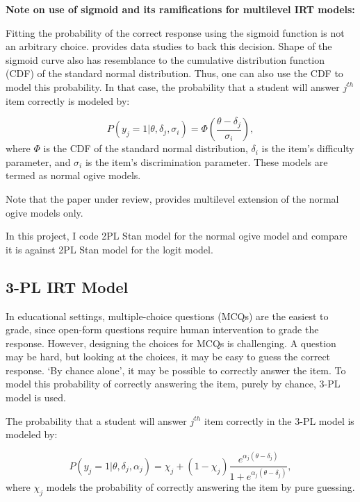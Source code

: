 \documentclass[12pt]{article}
\begin{document}
\textbf{Note on use of sigmoid and its ramifications for multilevel IRT models:}

Fitting the probability of the correct response using the sigmoid function is not an arbitrary choice. \cite{de2013theory} provides data studies to back this decision. Shape of the sigmoid curve also has resemblance to the cumulative distribution function (CDF) of the standard normal distribution. Thus, one can also use the CDF to model this probability. In that case, the probability that a student will answer $j^{th}$ item correctly is modeled by:

\begin{equation}\label{eq:2pl_normal_ogive}
    P(y_j=1|\theta, \delta_j, \sigma_i) = \Phi(\frac{\theta - \delta_j}{\sigma_i}),
\end{equation}
where $\Phi$ is the CDF of the standard normal distribution, $\delta_i$ is the item's difficulty parameter, and $\sigma_i$ is the item's discrimination parameter. These models are termed as normal ogive models.

Note that the paper under review, \cite{fox2001bayesian} provides multilevel extension of the normal ogive models only.

In this project, I code 2PL Stan model for the normal ogive model and compare it is against 2PL Stan model for the logit model.

\subsection{3-PL IRT Model}
In educational settings, multiple-choice questions (MCQs) are the easiest to grade, since open-form questions require human intervention to grade the response. However, designing the choices for MCQs is challenging. A question may be hard, but looking at the choices, it may be easy to guess the correct response. `By chance alone', it may be possible to correctly answer the item. To model this probability of correctly answering the item, purely by chance, 3-PL model is used.

The probability that a student will answer $j^{th}$ item correctly in the 3-PL model is modeled by:

\begin{equation}\label{eq:3pl}
    P(y_j=1|\theta, \delta_j, \alpha_j) = \chi_j + (1 - \chi_j) \frac{e^{\alpha_j(\theta - \delta_j)}}{1+e^{\alpha_j(\theta - \delta_j)}},
\end{equation}
where $\chi_j$ models the probability of correctly answering the item by pure guessing.
\end{document}
